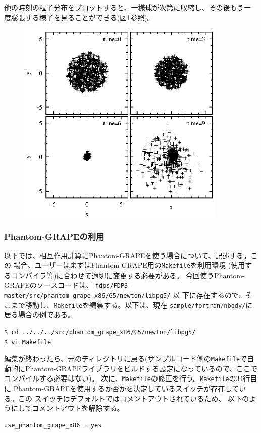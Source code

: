 \documentclass[12pt,a4paper,dvipdfmx]{jarticle}
\begin{document}
他の時刻の粒子分布をプロットすると、一様球が次第に収縮し、その後もう一
度膨張する様子を見ることができる(図\ref{fig:nbody}参照)。

\begin{figure}
  \begin{center}
        \includegraphics[width=10cm,bb=0 0 220 220]{fig/nbody.eps}
  \end{center}
  \caption{}
  \label{fig:nbody}
\end{figure}

\subsubsection{Phantom-GRAPEの利用}

以下では、相互作用計算にPhantom-GRAPEを使う場合について、記述する。この
場合、ユーザーはまずはPhantom-GRAPE用の\texttt{Makefile}を利用環境
(使用するコンパイラ等)に合わせて適切に変更する必要がある。
今回使うPhantom-GRAPEのソースコードは、
\texttt{fdps/FDPS-master/src/phantom\_grape\_x86/G5/newton/libpg5/} 以
下に存在するので、そこまで移動し、\texttt{Makefile}を編集する。以下は、現在
\texttt{sample/fortran/nbody/}に居る場合の例である。
\begin{screen}
\begin{verbatim}
$ cd ../../../src/phantom_grape_x86/G5/newton/libpg5/
$ vi Makefile
\end{verbatim}
\end{screen}

編集が終わったら、元のディレクトリに戻る(サンプルコード側の\texttt{Makefile}で自動的にPhantom-GRAPEライブラリをビルドする設定になっているので、ここでコンパイルする必要はない)。
次に、\texttt{Makefile}の修正を行う。\texttt{Makefile}の34行目に
Phantom-GRAPEを使用するか否かを決定しているスイッチが存在している。この
スイッチはデフォルトではコメントアウトされているため、
以下のようにしてコメントアウトを解除する。
\begin{screen}
\begin{verbatim}
use_phantom_grape_x86 = yes
\end{verbatim}
\end{screen}
\end{document}

